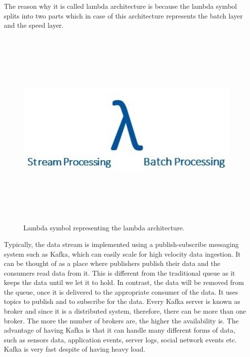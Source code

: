 The reason why it is called lambda architecture is because the lambda symbol splits into two parts which in case of this architecture represents the batch layer and the speed layer. 

\begin{figure}[htpb]
	\centering
	\includegraphics[width=12cm,height=10cm,keepaspectratio=true]{images/lambda_new}
	\caption{
		Lambda symbol representing the lambda architecture.
	}
	\label{fig:lambda}
\end{figure}

Typically, the data stream is implemented using a publish-subscribe messaging system such as Kafka, which can easily scale for high velocity data ingestion. It can be thought of as a place where publishers publish their data and the consumers read data from it. This is different from the traditional queue as it keeps the data until we let it to hold. In contrast, the data will be removed from the queue, once it is delivered to the appropriate consumer of the data. It uses topics to publish and to subscribe for the data. Every Kafka server is known as broker and since it is a distributed system, therefore, there can be more than one broker. The more the number of brokers are, the higher the availability is. The advantage of having Kafka is that it can handle many different forms of data, such as sensors data, application events, server logs, social network events etc. Kafka is very fast despite of having heavy load.

